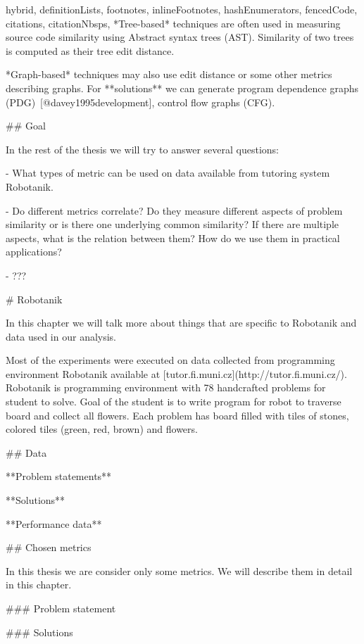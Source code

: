 \documentclass[
  digital, %
  table,   %
  lof,     %
  lot,     %
]{fithesis3}
\begin{document}
\begin{markdown*}{%
  hybrid,
  definitionLists,
  footnotes,
  inlineFootnotes,
  hashEnumerators,
  fencedCode,
  citations,
  citationNbsps,
}
*Tree-based* techniques are often used in measuring source code similarity using Abstract syntax trees (AST). Similarity of two trees is computed as their tree edit distance.

*Graph-based* techniques may also use edit distance or some other metrics describing graphs. For **solutions** we can generate program dependence graphs (PDG)~[@davey1995development], control flow graphs (CFG).

## Goal

In the rest of the thesis we will try to answer several questions:

- What types of metric can be used on data available from tutoring system Robotanik.

- Do different metrics correlate? Do they measure different aspects of problem similarity or is there one underlying common similarity? If there are multiple aspects, what is the relation between them? How do we use them in practical applications?

- ???

\iffalse
- Implement simple tool which will be able to ease comparing grid based problems and their solutions.
\fi

%
%

\iffalse %

# Robotanik

In this chapter we will talk more about things that are specific to Robotanik and data used in our analysis.

Most of the experiments were executed on data collected from programming environment Robotanik available at [tutor.fi.muni.cz](http://tutor.fi.muni.cz/). Robotanik is programming environment with 78 handcrafted problems for student to solve. Goal of the student is to write program for robot to traverse board and collect all flowers. Each problem has board filled with tiles of stones, colored tiles (green, red, brown) and flowers.

## Data

**Problem statements**

**Solutions**

**Performance data**

## Chosen metrics

In this thesis we are consider only some metrics. We will describe them in detail in this chapter.

### Problem statement

### Solutions


\end{markdown*}
\end{document}
